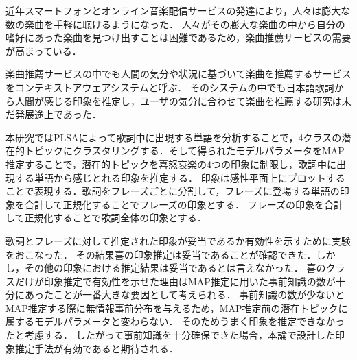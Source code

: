 近年スマートフォンとオンライン音楽配信サービスの発達により，人々は膨大な数の楽曲を手軽に聴けるようになった．
人々がその膨大な楽曲の中から自分の嗜好にあった楽曲を見つけ出すことは困難であるため，楽曲推薦サービスの需要が高まっている．

楽曲推薦サービスの中でも人間の気分や状況に基づいて楽曲を推薦するサービスをコンテキストアウェアシステムと呼ぶ．
そのシステムの中でも日本語歌詞から人間が感じる印象を推定し，ユーザの気分に合わせて楽曲を推薦する研究は未だ発展途上であった．

本研究ではPLSAによって歌詞中に出現する単語を分析することで，4クラスの潜在的トピックにクラスタリングする．そして得られたモデルパラメータをMAP推定することで，潜在的トピックを喜怒哀楽の4つの印象に制限し，歌詞中に出現する単語から感じとれる印象を推定する．
印象は感性平面上にプロットすることで表現する．歌詞をフレーズごとに分割して，フレーズに登場する単語の印象を合計して正規化することでフレーズの印象とする．
フレーズの印象を合計して正規化することで歌詞全体の印象とする．

歌詞とフレーズに対して推定された印象が妥当であるか有効性を示すために実験をおこなった．
その結果喜の印象推定は妥当であることが確認できた．しかし，その他の印象における推定結果は妥当であるとは言えなかった．
喜のクラスだけが印象推定で有効性を示せた理由はMAP推定に用いた事前知識の数が十分にあったことが一番大きな要因として考えられる．
事前知識の数が少ないとMAP推定する際に無情報事前分布を与えるため，MAP推定前の潜在トピックに属するモデルパラメータと変わらない．
そのためうまく印象を推定できなかったと考慮する．
したがって事前知識を十分確保できた場合，本論で設計した印象推定手法が有効であると期待される．